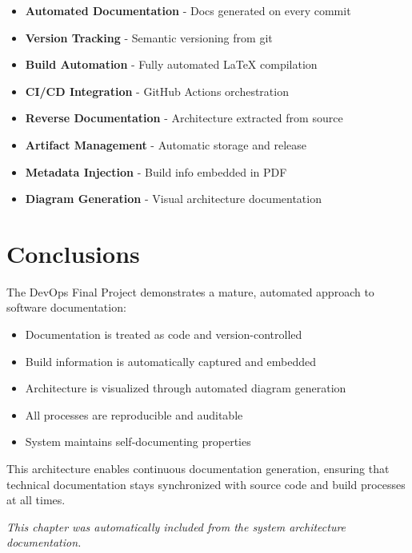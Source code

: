 \begin{itemize}
    \item \textbf{Automated Documentation} - Docs generated on every commit
    \item \textbf{Version Tracking} - Semantic versioning from git
    \item \textbf{Build Automation} - Fully automated LaTeX compilation
    \item \textbf{CI/CD Integration} - GitHub Actions orchestration
    \item \textbf{Reverse Documentation} - Architecture extracted from source
    \item \textbf{Artifact Management} - Automatic storage and release
    \item \textbf{Metadata Injection} - Build info embedded in PDF
    \item \textbf{Diagram Generation} - Visual architecture documentation
\end{itemize}

\section{Conclusions}
\label{sec:ArchConclusions}

The DevOps Final Project demonstrates a mature, automated approach to software documentation:

\begin{itemize}
    \item Documentation is treated as code and version-controlled
    \item Build information is automatically captured and embedded
    \item Architecture is visualized through automated diagram generation
    \item All processes are reproducible and auditable
    \item System maintains self-documenting properties
\end{itemize}

This architecture enables continuous documentation generation, ensuring that technical documentation stays synchronized with source code and build processes at all times.

\noindent
\textit{This chapter was automatically included from the system architecture documentation.}


